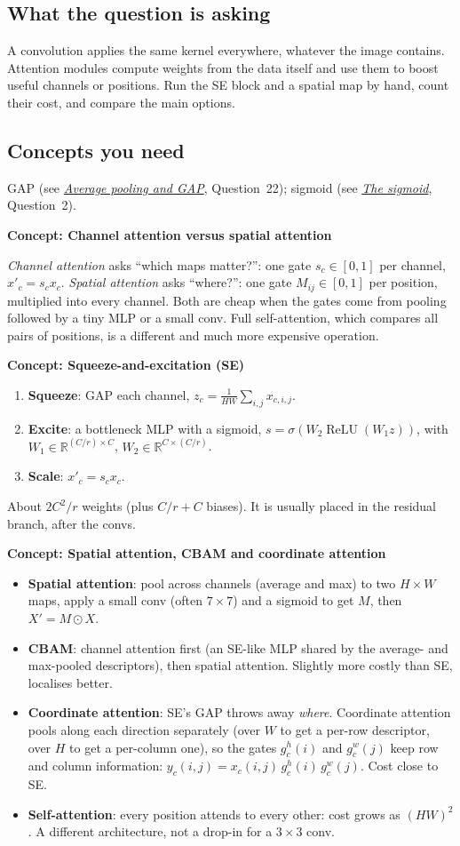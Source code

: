 \documentclass[12pt,a4paper]{article}
\newcommand{\concept}[2]{\par\medskip\phantomsection\label{#1}{\large\bfseries\color{blue!50!black} Concept: #2}\par}
\newcommand{\seeconcept}[3]{(see \hyperref[#1]{\textit{#2}}, Question~#3)}
\newcommand{\relu}{\operatorname{ReLU}}
\begin{document}
\subsection*{What the question is asking}
A convolution applies the same kernel everywhere, whatever the image contains. Attention modules compute weights from the data itself and use them to boost useful channels or positions. Run the SE block and a spatial map by hand, count their cost, and compare the main options.

\subsection*{Concepts you need}
GAP \seeconcept{c:avgpool}{Average pooling and GAP}{22}; sigmoid \seeconcept{c:sigmoid}{The sigmoid}{2}.

\concept{c:attnidea}{Channel attention versus spatial attention}
\emph{Channel attention} asks ``which maps matter?'': one gate $s_c\in[0,1]$ per channel, $x'_c=s_cx_c$. \emph{Spatial attention} asks ``where?'': one gate $M_{ij}\in[0,1]$ per position, multiplied into every channel. Both are cheap when the gates come from pooling followed by a tiny MLP or a small conv. Full self-attention, which compares all pairs of positions, is a different and much more expensive operation.

\concept{c:se}{Squeeze-and-excitation (SE)}
\begin{enumerate}[nosep]
\item \textbf{Squeeze}: GAP each channel, $z_c=\frac1{HW}\sum_{i,j}x_{c,i,j}$.
\item \textbf{Excite}: a bottleneck MLP with a sigmoid, $s=\sigma(W_2\relu(W_1z))$, with $W_1\in\mathbb R^{(C/r)\times C}$, $W_2\in\mathbb R^{C\times(C/r)}$.
\item \textbf{Scale}: $x'_c=s_cx_c$.
\end{enumerate}
About $2C^2/r$ weights (plus $C/r+C$ biases). It is usually placed in the residual branch, after the convs.

\concept{c:cbam}{Spatial attention, CBAM and coordinate attention}
\begin{itemize}[nosep]
\item \textbf{Spatial attention}: pool across channels (average and max) to two $H\times W$ maps, apply a small conv (often $7\times7$) and a sigmoid to get $M$, then $X'=M\odot X$.
\item \textbf{CBAM}: channel attention first (an SE-like MLP shared by the average- and max-pooled descriptors), then spatial attention. Slightly more costly than SE, localises better.
\item \textbf{Coordinate attention}: SE's GAP throws away \emph{where}. Coordinate attention pools along each direction separately (over $W$ to get a per-row descriptor, over $H$ to get a per-column one), so the gates $g^h_c(i)$ and $g^w_c(j)$ keep row and column information: $y_c(i,j)=x_c(i,j)\,g^h_c(i)\,g^w_c(j)$. Cost close to SE.
\item \textbf{Self-attention}: every position attends to every other: cost grows as $(HW)^2$. A different architecture, not a drop-in for a $3\times3$ conv.
\end{itemize}
\end{document}
